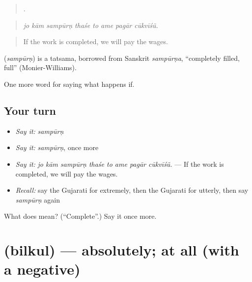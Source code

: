 \begin{quote}
       .
\end{quote}

\begin{quote}
\emph{jo kām sampūrṇ thaśe to ame pagār cūkvīśũ.}
\end{quote}

\begin{quote}
If the work is completed, we will pay the wages.
\end{quote}

\begin{cousinweb}
\textbf{} (\emph{sampūrṇ}) is a tatsama, borrowed from Sanskrit \emph{sampūrṇa}, \textquotedblleft{}completely filled, full\textquotedblright{} (Monier-Williams).
\end{cousinweb}

\begin{grammarlens}[title={What you've built}]
One more word for saying what happens if.
\end{grammarlens}

\subsection*{Your turn}
\begin{itemize}
\raggedright
  \item \emph{Say it:} \emph{sampūrṇ}
  \item \emph{Say it:} \emph{sampūrṇ}, once more
  \item \emph{Say it:} \emph{jo kām sampūrṇ thaśe to ame pagār cūkvīśũ.} — If the work is completed, we will pay the wages.
  \item \emph{Recall:} say the Gujarati for extremely, then the Gujarati for utterly, then say \emph{sampūrṇ} again
\end{itemize}

\begin{tcolorbox}[breakable,colback=teal!4,colframe=teal!35!black,title={Before you move on}]
What does  mean? (\textquotedblleft{}Complete\textquotedblright{}.) Say it once more.
\end{tcolorbox}
\section[\texorpdfstring{\gu{બિલકુલ} (bilkul)}{બિલકુલ (bilkul)}]{ (bilkul) — absolutely; at all (with a negative)}

